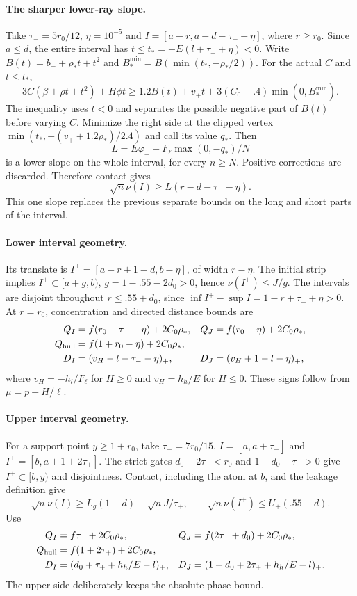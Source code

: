 \documentclass[11pt,a4paper]{article}
\numberwithin{equation}{section}
\theoremstyle{definition}
\theoremstyle{remark}
\newcommand{\pos}[1]{(#1)_+}
\begin{document}
\paragraph{The sharper lower-ray slope.}
Take $\tau_-=5r_0/12$, $\eta=10^{-5}$ and
$I=[a-r,a-d-\tau_--\eta]$, where $r\ge r_0$.
Since $a\le d$, the entire interval has
$t\le t_*=-E(l+\tau_-+\eta)<0$.
Write $B(t)=b_-+\rho_*t+t^2$ and
$B_*^{\min}=B(\min(t_*,-\rho_*/2))$. For the actual $C$ and $t\le t_*$,
\[
 3C(\beta+\rho t+t^2)+H\phi t
 \ge1.2B(t)+v_+t+3(C_0-.4)\min(0,B_*^{\min}).
\]
The inequality uses $t<0$ and separates the possible negative part of
$B(t)$ before varying $C$. Minimize the right side at the clipped vertex
$\min(t_*,-(v_++1.2\rho_*)/2.4)$ and call its value $q_*$. Then
\[
 L=E\varphi_--F_\ell\max(0,-q_*)/N
\]
is a lower slope on the whole interval, for every $n\ge N$.
Positive corrections are discarded. Therefore contact gives
\[
 \sqrt n\nu(I)\ge L(r-d-\tau_--\eta).
\]
This one slope replaces the previous separate bounds on the long and
short parts of the interval.

\paragraph{Lower interval geometry.}
Its translate is $I^+=[a-r+1-d,b-\eta]$, of width $r-\eta$.
The initial strip implies $I^+\subset[a+g,b)$,
$g=1-.55-2d_0>0$, hence $\nu(I^+)\le J/g$.
The intervals are disjoint throughout $r\le.55+d_0$, since
$\inf I^+-\sup I=1-r+\tau_-+\eta>0$.
At $r=r_0$, concentration and directed distance bounds are
\begin{align*}
 Q_I&=f(r_0-\tau_--\eta)+2C_0\rho_*,&
 Q_J&=f(r_0-\eta)+2C_0\rho_*,\\
 Q_{\rm hull}&=f(1+r_0-\eta)+2C_0\rho_*,\\
 D_I&=\pos{v_H-l-\tau_--\eta},&
 D_J&=\pos{v_H+1-l-\eta},
\end{align*}
where $v_H=-h_l/F_\ell$ for $H\ge0$ and $v_H=h_h/E$ for $H\le0$.
These signs follow from $\mu=p+H/\ell$.

\paragraph{Upper interval geometry.}
For a support point $y\ge1+r_0$, take $\tau_+=7r_0/15$,
$I=[a,a+\tau_+]$ and $I^+=[b,a+1+2\tau_+]$.
The strict gates $d_0+2\tau_+<r_0$ and $1-d_0-\tau_+>0$ give
$I^+\subset[b,y)$ and disjointness. Contact, including the atom at $b$,
and the leakage definition give
\[
 \sqrt n\nu(I)\ge L_g(1-d)-\sqrt nJ/\tau_+,\qquad
 \sqrt n\nu(I^+)\le U_+(.55+d).
\]
Use
\begin{align*}
 Q_I&=f\tau_++2C_0\rho_*,&Q_J&=f(2\tau_++d_0)+2C_0\rho_*,\\
 Q_{\rm hull}&=f(1+2\tau_+)+2C_0\rho_*,\\
 D_I&=\pos{d_0+\tau_++h_h/E-l},&
 D_J&=\pos{1+d_0+2\tau_++h_h/E-l}.
\end{align*}
The upper side deliberately keeps the absolute phase bound.
\end{document}
